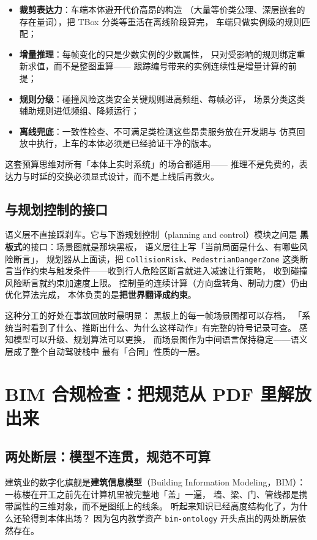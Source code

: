 \begin{itemize}
\item \textbf{裁剪表达力}：车端本体避开代价高昂的构造
  （大量等价类公理、深层嵌套的存在量词），把 TBox 分类等重活在离线阶段算完，
  车端只做实例级的规则匹配；
\item \textbf{增量推理}：每帧变化的只是少数实例的少数属性，
  只对受影响的规则绑定重新求值，而不是整图重算——
  跟踪编号带来的实例连续性是增量计算的前提；
\item \textbf{规则分级}：碰撞风险这类安全关键规则进高频组、每帧必评，
  场景分类这类辅助规则进低频组、降频运行；
\item \textbf{离线兜底}：一致性检查、不可满足类检测这些昂贵服务放在开发期与
  仿真回放中执行，上车的本体必须是已经验证干净的版本。
\end{itemize}

这套预算思维对所有「本体上实时系统」的场合都适用——
推理不是免费的，表达力与时延的交换必须显式设计，而不是上线后再救火。

\subsection{与规划控制的接口}

语义层不直接踩刹车。它与下游规划控制（planning and control）模块之间是
\textbf{黑板式}的接口：场景图就是那块黑板，
语义层往上写「当前局面是什么、有哪些风险断言」，
规划器从上面读，把 \texttt{CollisionRisk}、\texttt{PedestrianDangerZone}
这类断言当作约束与触发条件——收到行人危险区断言就进入减速让行策略，
收到碰撞风险断言就约束加速度上限。
控制量的连续计算（方向盘转角、制动力度）仍由优化算法完成，
本体负责的是\textbf{把世界翻译成约束}。

这种分工的好处在事故回放时最明显：
黑板上的每一帧场景图都可以存档，
「系统当时看到了什么、推断出什么、为什么这样动作」有完整的符号记录可查。
感知模型可以升级、规划算法可以更换，
而场景图作为中间语言保持稳定——语义层成了整个自动驾驶栈中
最有「合同」性质的一层。

\section{BIM 合规检查：把规范从 PDF 里解放出来}

\subsection{两处断层：模型不连贯，规范不可算}

建筑业的数字化旗舰是\textbf{建筑信息模型}（Building Information Modeling，BIM）：
一栋楼在开工之前先在计算机里被完整地「盖」一遍，
墙、梁、门、管线都是携带属性的三维对象，而不是图纸上的线条。
听起来知识已经高度结构化了，为什么还轮得到本体出场？
因为包内教学资产 \texttt{bim-ontology} 开头点出的两处断层依然存在。

